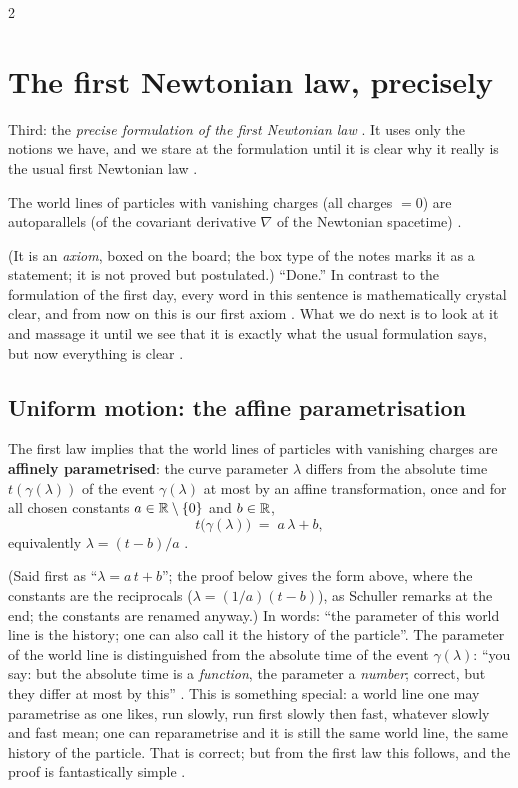\begin{paracol}{2}
\section{The first Newtonian law, precisely}\label{sec:nk-first-law}

Third: the \emph{precise formulation of the first Newtonian law} . It uses only the notions we have, and we stare at the formulation until it is clear why it really is the usual first Newtonian law
.
\begin{theorem}\label{ax:nk-first}
The world lines of particles with vanishing charges (all charges $=0$) are autoparallels (of the covariant derivative $\nabla$ of the Newtonian spacetime) .
\end{theorem}
(It is an \emph{axiom}, boxed on the board; the box type of the notes marks it as a statement; it is not proved but postulated.) ``Done.'' In contrast to the formulation of the first day, every word in this sentence is mathematically
crystal clear, and from now on this is our first axiom . What we do next is to look at it and massage it until we see that it is exactly what the usual formulation says, but now everything is clear
.

\subsection{Uniform motion: the affine parametrisation}\label{ssec:nk-affine}

\begin{theorem}\label{thm:nk-affine}
The first law implies that the world lines of particles with vanishing charges are \textbf{affinely parametrised}: the curve parameter $\lambda$ differs from the absolute time $t(\gamma(\lambda))$ of the event $\gamma(\lambda)$ at most by an affine
transformation, once and for all chosen constants $a\in\mathbb{R}\setminus\{0\}$ and $b\in\mathbb{R}$,
\[
  t\bigl(\gamma(\lambda)\bigr)\;=\;a\,\lambda+b ,
\]
equivalently $\lambda=(t-b)/a$ .
\end{theorem}
(Said first as ``$\lambda=a\,t+b$''; the proof below gives the form above, where the constants are the reciprocals ($\lambda = (1/a)(t-b)$), as Schuller remarks at the end; the constants are renamed anyway.)
In words: ``the parameter of this world line is the history; one can also call it the history of the particle''. The parameter of the world line is distinguished from the absolute time of the event $\gamma(\lambda)$: ``you say: but the absolute time is a
\emph{function}, the parameter a \emph{number}; correct, but they differ at most by this'' . This is something special: a world line one may parametrise as one likes, run slowly, run first slowly then fast, whatever slowly and fast mean;
one can reparametrise and it is still the same world line, the same history of the particle. That is correct; but from the first law this follows, and the proof is fantastically simple .


\end{paracol}
